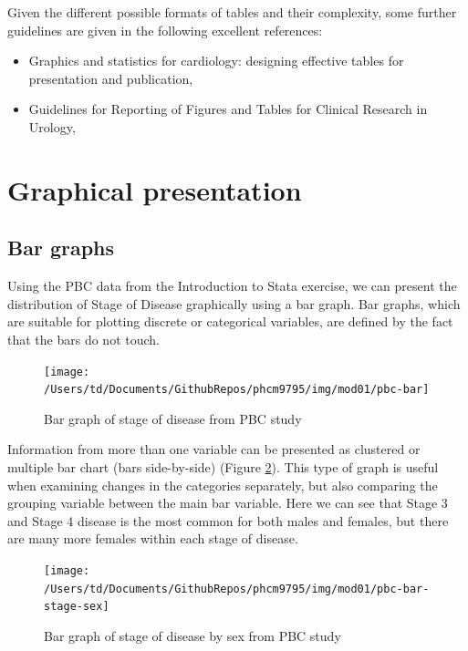 \documentclass[
]{memoir}
\providecommand{\tightlist}{%
  \setlength{\itemsep}{0pt}\setlength{\parskip}{0pt}}
\begin{document}
Given the different possible formats of tables and their complexity, some further guidelines are given in the following excellent references:

\begin{itemize}
\tightlist
\item
  Graphics and statistics for cardiology: designing effective tables for presentation and publication, \citet{boers18}
\item
  Guidelines for Reporting of Figures and Tables for Clinical Research in Urology, \citet{vickers_etal20}
\end{itemize}

\hypertarget{graphical-presentation}{%
\section{Graphical presentation}\label{graphical-presentation}}

\hypertarget{bar-graphs}{%
\subsection{Bar graphs}\label{bar-graphs}}

Using the PBC data from the Introduction to Stata exercise, we can present the distribution of Stage of Disease graphically using a bar graph. Bar graphs, which are suitable for plotting discrete or categorical variables, are defined by the fact that the bars do not touch.

\begin{figure}[H]
\texttt{[image: /Users/td/Documents/GithubRepos/phcm9795/img/mod01/pbc-bar]} \caption{Bar graph of stage of disease from PBC study}\label{fig:fig-1-1}
\end{figure}

Information from more than one variable can be presented as clustered or multiple bar chart (bars side-by-side) (Figure \ref{fig:fig-1-2}). This type of graph is useful when examining changes in the categories separately, but also comparing the grouping variable between the main bar variable. Here we can see that Stage 3 and Stage 4 disease is the most common for both males and females, but there are many more females within each stage of disease.

\begin{figure}[H]
\texttt{[image: /Users/td/Documents/GithubRepos/phcm9795/img/mod01/pbc-bar-stage-sex]} \caption{Bar graph of stage of disease by sex from PBC study}\label{fig:fig-1-2}
\end{figure}
\end{document}
